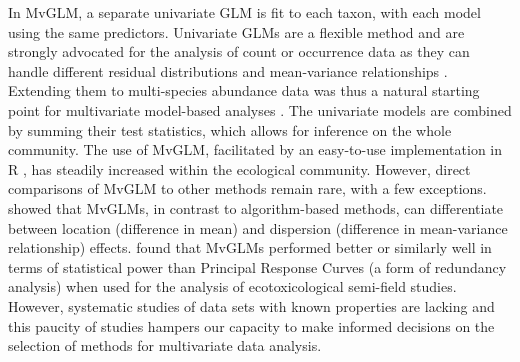 \documentclass[a4paper,11pt]{article}
\begin{document}
	
	In MvGLM, a separate univariate GLM is fit to each taxon, with each model using the same predictors. 
	Univariate GLMs are a flexible method and are strongly advocated for the analysis of count or occurrence data as they can handle different residual distributions and mean-variance relationships \citep{OHara2010, Warton2011, Szocs2015_b}.
	Extending them to multi-species abundance data was thus a natural starting point for multivariate model-based analyses \citep{Warton2012}.
	The univariate models are combined by summing their test statistics, which allows for inference on the whole community.
	The use of MvGLM, facilitated by an easy-to-use implementation in R  \citep[in the \textit{mvabund} R-package, ][]{Wang2019}, has steadily increased within the ecological community. 
	However, direct comparisons of MvGLM to other methods remain rare, with a few exceptions.
 	\citet{Warton2012} showed that MvGLMs, in contrast to algorithm-based methods, can differentiate between location (difference in mean) and dispersion (difference in mean-variance relationship) effects. 
	\citet{Szocs2015} found that MvGLMs performed better or similarly well in terms of statistical power than Principal Response Curves (a form of redundancy analysis) when used for the analysis of ecotoxicological semi-field studies. 
	However, systematic studies of data sets with known properties are lacking and this paucity of studies hampers our capacity to make informed decisions on the selection of methods for multivariate data analysis.\\
\end{document}
